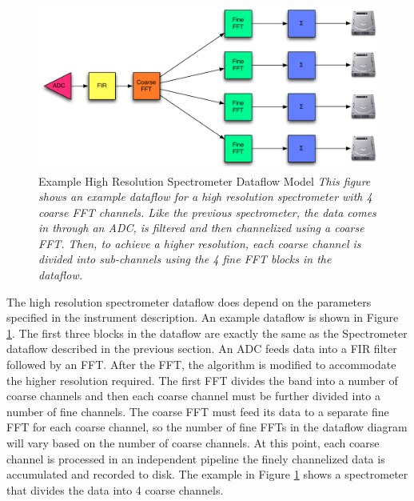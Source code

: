 \begin{figure}[ht!]
  \centering
    \includegraphics[width=1\textwidth]{Images/C4/hires_spectrometer_dataflow.pdf}
  \caption[Example High Resolution Spectrometer Dataflow Model]{Example High Resolution Spectrometer Dataflow Model
  \textit{
  This figure shows an example dataflow for a high resolution spectrometer with 4 coarse FFT channels.
  Like the previous spectrometer, the data comes in through an ADC, is filtered and then channelized using a coarse FFT.
  Then, to achieve a higher resolution, each coarse channel is divided into sub-channels using the 4 fine FFT blocks in the dataflow. 
  }}

  \label{fig: C4/hires_spectrometer_dataflow.pdf}
\end{figure}

The high resolution spectrometer dataflow does depend on the parameters specified in the instrument description. 
An example dataflow is shown in Figure \ref{fig: C4/hires_spectrometer_dataflow.pdf}. 
The first three blocks in the dataflow are exactly the same as the Spectrometer dataflow described in the previous section. 
An ADC feeds data into a FIR filter followed by an FFT. 
After the FFT, the algorithm is modified to accommodate the higher resolution required. 
The first FFT divides the band into a number of coarse channels and then each coarse channel must be further divided into a number of fine channels. 
The coarse FFT must feed its data to a separate fine FFT for each coarse channel, so the number of fine FFTs in the dataflow diagram will vary based on the number of coarse channels.
At this point, each coarse channel is processed in an independent pipeline the finely channelized data is accumulated and recorded to disk. 
The example in Figure \ref{fig: C4/hires_spectrometer_dataflow.pdf} shows a spectrometer that divides the data into 4 coarse channels.

